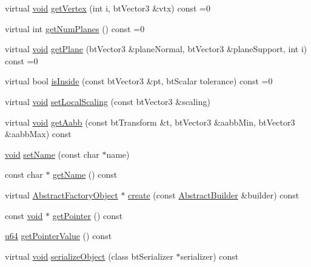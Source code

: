 \begin{DoxyCompactItemize}
\item 
virtual \mbox{\hyperlink{_thread_8h_af1e856da2e658414cb2456cb6f7ebc66}{void}} \mbox{\hyperlink{classnjli_1_1_physics_shape_acb05a16bdbfa5cee6dcbab5c253eb78e}{get\+Vertex}} (int i, bt\+Vector3 \&vtx) const =0
\item 
virtual int \mbox{\hyperlink{classnjli_1_1_physics_shape_a11cb80220393bfce177b8bdc34f7f359}{get\+Num\+Planes}} () const =0
\item 
virtual \mbox{\hyperlink{_thread_8h_af1e856da2e658414cb2456cb6f7ebc66}{void}} \mbox{\hyperlink{classnjli_1_1_physics_shape_ad5418af48c1210d6d5119244826cacbb}{get\+Plane}} (bt\+Vector3 \&plane\+Normal, bt\+Vector3 \&plane\+Support, int i) const =0
\item 
virtual bool \mbox{\hyperlink{classnjli_1_1_physics_shape_a346a118ddc9e6b446ae7a8586fee76fa}{is\+Inside}} (const bt\+Vector3 \&pt, bt\+Scalar tolerance) const =0
\item 
virtual \mbox{\hyperlink{_thread_8h_af1e856da2e658414cb2456cb6f7ebc66}{void}} \mbox{\hyperlink{classnjli_1_1_physics_shape_afd2f02f3fd7ab5c1b48f445f2831f18f}{set\+Local\+Scaling}} (const bt\+Vector3 \&scaling)
\item 
virtual \mbox{\hyperlink{_thread_8h_af1e856da2e658414cb2456cb6f7ebc66}{void}} \mbox{\hyperlink{classnjli_1_1_physics_shape_a33ae845e59c2c693c07a17cc112bba3f}{get\+Aabb}} (const bt\+Transform \&t, bt\+Vector3 \&aabb\+Min, bt\+Vector3 \&aabb\+Max) const
\item 
\mbox{\hyperlink{_thread_8h_af1e856da2e658414cb2456cb6f7ebc66}{void}} \mbox{\hyperlink{classnjli_1_1_physics_shape_a087eb5f8d9f51cc476f12f1d10a3cb95}{set\+Name}} (const char $\ast$name)
\item 
const char $\ast$ \mbox{\hyperlink{classnjli_1_1_physics_shape_ad41266885be835f3ee602311e20877a4}{get\+Name}} () const
\item 
virtual \mbox{\hyperlink{classnjli_1_1_abstract_factory_object}{Abstract\+Factory\+Object}} $\ast$ \mbox{\hyperlink{classnjli_1_1_physics_shape_a83a8876ae63b92804004cf3febe76573}{create}} (const \mbox{\hyperlink{classnjli_1_1_abstract_builder}{Abstract\+Builder}} \&builder) const
\item 
const \mbox{\hyperlink{_thread_8h_af1e856da2e658414cb2456cb6f7ebc66}{void}} $\ast$ \mbox{\hyperlink{classnjli_1_1_physics_shape_ac4ca71716ed832be357f15f8262c8448}{get\+Pointer}} () const
\item 
\mbox{\hyperlink{_util_8h_ad758b7a5c3f18ed79d2fcd23d9f16357}{u64}} \mbox{\hyperlink{classnjli_1_1_physics_shape_a4ffddf141a426a5a07d0ac19f1913811}{get\+Pointer\+Value}} () const
\item 
virtual \mbox{\hyperlink{_thread_8h_af1e856da2e658414cb2456cb6f7ebc66}{void}} \mbox{\hyperlink{classnjli_1_1_physics_shape_a4fc4bcd9d1930911474210c047372fc0}{serialize\+Object}} (class bt\+Serializer $\ast$serializer) const
\end{DoxyCompactItemize}
